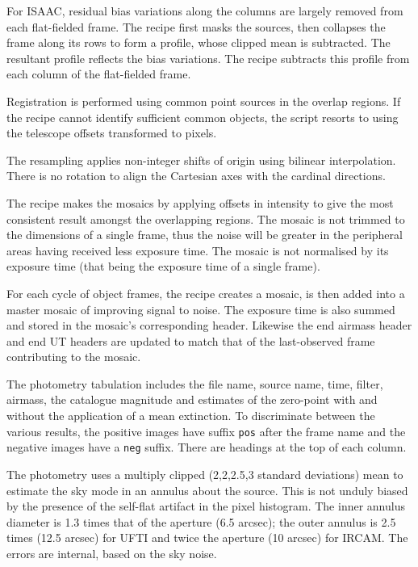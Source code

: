 \documentclass[twoside,11pt]{article}
\renewcommand{\_}{\texttt{\symbol{95}}}
\newcommand{\sstitem}{\item}
\begin{document}
{{{         \sstitem
         For ISAAC, residual bias variations along the columns are
         largely removed from each flat-fielded frame.  The recipe first
         masks the sources, then collapses the frame along its rows to form
         a profile, whose clipped mean is subtracted.  The resultant profile
         reflects the bias variations.  The recipe subtracts this profile
         from each column of the flat-fielded frame.

         \sstitem
         Registration is performed using common point sources in the
         overlap regions.  If the recipe cannot identify sufficient common
         objects, the script resorts to using the telescope offsets
         transformed to pixels.

         \sstitem
         The resampling applies non-integer shifts of origin using
         bilinear interpolation.  There is no rotation to align the
         Cartesian axes with the cardinal directions.

         \sstitem
         The recipe makes the mosaics by applying offsets in intensity
         to give the most consistent result amongst the overlapping regions.
         The mosaic is not trimmed to the dimensions of a single frame, thus
         the noise will be greater in the peripheral areas having received
         less exposure time.  The mosaic is not normalised by its exposure
         time (that being the exposure time of a single frame).

         \sstitem 
         For each cycle of object frames, the recipe creates a mosaic,
         is then added into a master mosaic of improving signal to noise. 
         The exposure time is also summed and stored in the mosaic's corresponding
         header.  Likewise the end airmass header and end UT headers are
	 updated to match that of the last-observed frame contributing
	 to the mosaic.

         \sstitem
         The photometry tabulation includes the file name, source
         name, time, filter, airmass, the catalogue magnitude and
         estimates of the zero-point with and without the application
         of a mean extinction.  To discriminate between the various
         results, the positive images have suffix {\tt \_pos} after the
         frame name and the negative images have a {\tt \_neg} suffix.
         There are headings at the top of each column.

         \sstitem
         The photometry uses a multiply clipped (2,2,2.5,3 standard
         deviations) mean to estimate the sky mode in an annulus about
         the source.  This is not unduly biased by the presence of the
         self-flat artifact in the pixel histogram. The inner annulus
         diameter is 1.3 times that of the aperture (6.5 arcsec); the
         outer annulus is 2.5 times (12.5 arcsec) for UFTI and twice
         the aperture (10 arcsec) for IRCAM.  The errors are internal,
         based on the sky noise.

}}}
\end{document}
